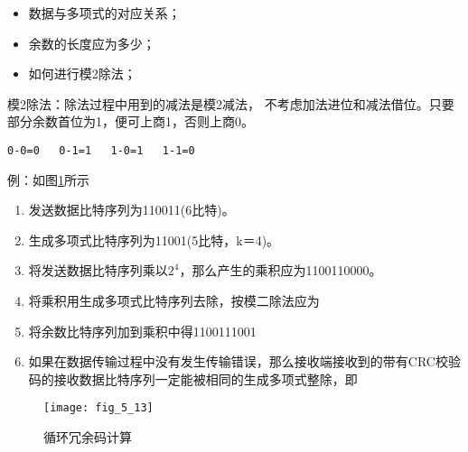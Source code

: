 \begin{description}
\begin{remark}

\begin{itemize}
  \item 数据与多项式的对应关系；
  \item 余数的长度应为多少；
  \item 如何进行模2除法；
\end{itemize}
\end{remark}

\begin{remark}
模2除法：除法过程中用到的减法是模2减法， 不考虑加法进位和减法借位。只要部分余数首位为1，便可上商1，否则上商0。

\begin{verbatim}
0-0=0   0-1=1   1-0=1   1-1=0
\end{verbatim}

\end{remark}

\begin{remark}

例：如图\ref{fig_5_13}所示


\begin{enumerate}
  \item 发送数据比特序列为110011(6比特)。
  \item 生成多项式比特序列为11001(5比特，k＝4)。
  \item 将发送数据比特序列乘以$2^4$，那么产生的乘积应为1100110000。
  \item 将乘积用生成多项式比特序列去除，按模二除法应为
  \item 将余数比特序列加到乘积中得1100111001

\item 如果在数据传输过程中没有发生传输错误，那么接收端接收到的带有CRC校验码的接收数据比特序列一定能被相同的生成多项式整除，即
\end{enumerate}


\end{remark}

\begin{center}
\begin{figure}
\centering
  \texttt{[image: fig\_5\_13]}\\
  \caption{循环冗余码计算}\label{fig_5_13}
\end{figure}
\end{center}



\end{description}


